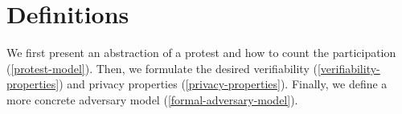 \section{Definitions}
\label{definitions}
We first present an abstraction of a protest and how to count the
participation (\cref{protest-model}). Then, we formulate the desired
verifiability (\cref{verifiability-properties}) and privacy properties
(\cref{privacy-properties}).
Finally, we define a more concrete adversary model 
(\cref{formal-adversary-model}).








